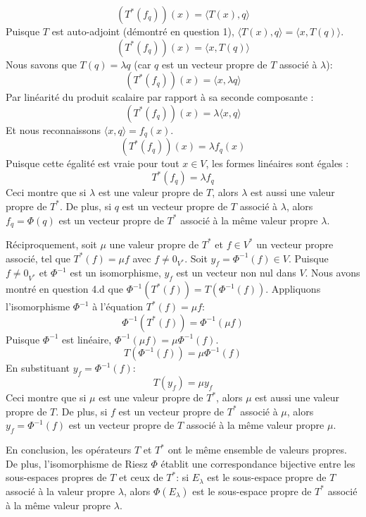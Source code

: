 \documentclass[11pt,a4paper]{report}
\begin{document}
\begin{enumerate}
\begin{enumerate}
    \[ (T^*(f_q))(x) = \langle T(x), q \rangle \] Puisque \(T\) est
    auto-adjoint (démontré en question 1),
    \(\langle T(x), q \rangle = \langle x, T(q) \rangle\).
    \[ (T^*(f_q))(x) = \langle x, T(q) \rangle \] Nous savons que
    \(T(q) = \lambda q\) (car \(q\) est un vecteur propre de \(T\)
    associé à \(\lambda\)):
    \[ (T^*(f_q))(x) = \langle x, \lambda q \rangle \] Par linéarité du
    produit scalaire par rapport à sa seconde composante :
    \[ (T^*(f_q))(x) = \lambda \langle x, q \rangle \] Et nous
    reconnaissons \(\langle x, q \rangle = f_q(x)\).
    \[ (T^*(f_q))(x) = \lambda f_q(x) \] Puisque cette égalité est vraie
    pour tout \(x \in V\), les formes linéaires sont égales :
    \[ T^*(f_q) = \lambda f_q \] Ceci montre que si \(\lambda\) est une
    valeur propre de \(T\), alors \(\lambda\) est aussi une valeur
    propre de \(T^*\). De plus, si \(q\) est un vecteur propre de \(T\)
    associé à \(\lambda\), alors \(f_q = \Phi(q)\) est un vecteur propre
    de \(T^*\) associé à la même valeur propre \(\lambda\).

    Réciproquement, soit \(\mu\) une valeur propre de \(T^*\) et
    \(f \in V^*\) un vecteur propre associé, tel que \(T^*(f) = \mu f\)
    avec \(f \neq 0_{V^*}\). Soit \(y_f = \Phi^{-1}(f) \in V\). Puisque
    \(f \neq 0_{V^*}\) et \(\Phi^{-1}\) est un isomorphisme, \(y_f\) est
    un vecteur non nul dans \(V\). Nous avons montré en question 4.d que
    \(\Phi^{-1}(T^*(f)) = T(\Phi^{-1}(f))\). Appliquons l'isomorphisme
    \(\Phi^{-1}\) à l'équation \(T^*(f) = \mu f\):
    \[ \Phi^{-1}(T^*(f)) = \Phi^{-1}(\mu f) \] Puisque \(\Phi^{-1}\) est
    linéaire, \(\Phi^{-1}(\mu f) = \mu \Phi^{-1}(f)\).
    \[ T(\Phi^{-1}(f)) = \mu \Phi^{-1}(f) \] En substituant
    \(y_f = \Phi^{-1}(f)\): \[ T(y_f) = \mu y_f \] Ceci montre que si
    \(\mu\) est une valeur propre de \(T^*\), alors \(\mu\) est aussi
    une valeur propre de \(T\). De plus, si \(f\) est un vecteur propre
    de \(T^*\) associé à \(\mu\), alors \(y_f = \Phi^{-1}(f)\) est un
    vecteur propre de \(T\) associé à la même valeur propre \(\mu\).

    En conclusion, les opérateurs \(T\) et \(T^*\) ont le même ensemble
    de valeurs propres. De plus, l'isomorphisme de Riesz \(\Phi\)
    établit une correspondance bijective entre les sous-espaces propres
    de \(T\) et ceux de \(T^*\): si \(E_\lambda\) est le sous-espace
    propre de \(T\) associé à la valeur propre \(\lambda\), alors
    \(\Phi(E_\lambda)\) est le sous-espace propre de \(T^*\) associé à
    la même valeur propre \(\lambda\).
  \end{enumerate}
\end{enumerate}
\end{document}
